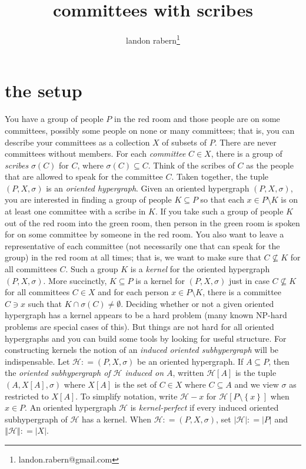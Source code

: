 \documentclass[12pt]{article}
\title{committees with scribes}
\author{landon rabern\thanks{landon.rabern@gmail.com}}
\newcommand{\fancy}[1]{\mathcal{#1}}
\newcommand{\HH}{\fancy{H}}
\newcommand{\set}[1]{\left\{ #1 \right\}}
\newcommand{\card}[1]{\left|#1\right|}
\newcommand{\size}[1]{\left\Vert#1\right\Vert}
\newcommand{\brackets}[1]{\left[ #1 \right]}
\newcommand{\DefinedAs}{\mathrel{\mathop:}=}
\def\s{\sigma}
\begin{document}
\maketitle

\section*{the setup}
You have a group of people $P$ in the red room and those people are on some committees, possibly some people on none or many committees; that is, you can describe your
committees as a collection $X$ of subsets of $P$.  There are never committees without members. For each \emph{committee} $C \in X$, there is a group of \emph{scribes} $\s(C)$ for $C$,  where $\s(C) \subseteq C$.
Think of the scribes of $C$ as the people that are allowed to speak for the committee $C$.
Taken together, the tuple $(P,X,\sigma)$ is an \emph{oriented hypergraph}.  Given an oriented hypergraph $(P,X,\sigma)$, you are interested in finding a
group of people $K \subseteq P$ so that each $x \in P \setminus K$ is on at least one committee with a scribe in $K$.  
If you take such a group of people $K$ out of the red room into the green room,
then person in the green room is spoken for on some committee by someone in the red room. 
You also want to leave a representative of each committee (not necessarily one that can speak for the group) in the red room
at all times; that is, we want to make sure that $C \not \subseteq K$ for all committees $C$.  Such a group $K$ is a \emph{kernel} for the oriented hypergraph $(P,X,\sigma)$.  
More succinctly, $K \subseteq P$ is a kernel for $(P,X,\sigma)$ just in case $C \not \subseteq K$ for all committees $C \in X$ and for each person $x\in P\setminus K$, there is a committee $C \ni x$ such that $K \cap \sigma(C) \ne \emptyset$.  Deciding
whether or not a given oriented hypergraph has a kernel appears to be a hard problem (many known NP-hard problems are special cases of this).  But things are not hard for
all oriented hypergraphs and you can build some tools by looking for useful structure.  For constructing kernels the notion of an \emph{induced oriented subhypergraph} will be indispensable.
Let $\HH \DefinedAs (P,X,\sigma)$ be an oriented hypergraph.  If $A \subseteq P$, then the \emph{oriented subhypergraph of $\HH$ induced on $A$}, written $\HH[A]$ is the tuple 
$(A, X\brackets{A}, \sigma)$ where $X\brackets{A}$ is the set of $C \in X$ where $C \subseteq A$ and we view $\sigma$ as restricted to $X\brackets{A}$.  To simplify notation, write 
$\HH-x$ for $\HH\brackets{P\setminus\set{x}}$ when $x \in P$. 
An oriented hypergraph $\HH$ is \emph{kernel-perfect} if every induced oriented subhypergraph of $\HH$ has a kernel.  When $\HH \DefinedAs (P,X,\sigma)$, set $\card{\HH} \DefinedAs \card{P}$
and $\size{\HH} \DefinedAs \card{X}$.
\end{document}
